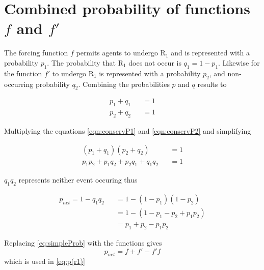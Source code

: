 \chapter{Combined probability of functions $f$ and $f'$}
\label{apndx:prob}

\hspace{\parindent} The forcing function $f$ permits agents to undergo $\mathrm{R_{1}}$ and is represented with a probability $p_{1}$.
The probability that $\mathrm{R_{1}}$ does not occur is $q_{1} = 1 - p_{1}$.
Likewise for the function $f'$ to undergo $\mathrm{R_{1}}$ is represented with a probability $p_{2}$, and non-occurring probability $q_{2}$.
Combining the probabilities $p$ and $q$ results to

\begin{eqnarray}
\label{eqn:conservP1}
p_{1} + q_{1} &&= 1 \\
\label{eqn:conservP2}
p_{2} + q_{2} &&= 1
\end{eqnarray}

Multiplying the equations \eqref{eqn:conservP1} and \eqref{eqn:conservP2} and simplifying

\begin{eqnarray}
(p_{1} + q_{1})(p_{2} + q_{2}) &&= 1 \\
p_{1}p_{2} + p_{1}q_{2} + p_{2}q_{1} + q_{1}q_{2} &&= 1
\end{eqnarray}

$q_{1}q_{2}$ represents neither event occuring thus

\begin{eqnarray}
p_{net} = 1 - q_{1}q_{2} &&= 1 - (1-p_{1})(1-p_{2}) \\
&&= 1 - (1 - p_{1} - p_{2} + p_{1}p_{2}) \\
&&= p_{1} + p_{2} - p_{1}p_{2}
\label{eq:simpleProb}
\end{eqnarray}

Replacing \eqref{eq:simpleProb} with the functions gives
\begin{equation}
p_{net} = f + f' - f'f
\end{equation}
which is used in \eqref{eq:p(r1)}
